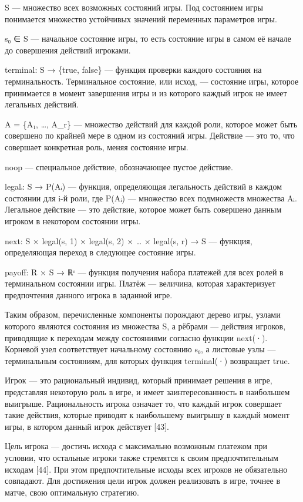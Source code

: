 S — множество всех возможных состояний игры. Под состоянием игры понимается множество устойчивых значений переменных параметров игры.

s₀ ∈ S — начальное состояние игры, то есть состояние игры в самом её начале до совершения действий игроками.

terminal: S → \{true, false\} — функция проверки каждого состояния на терминальность. Терминальное состояние, или исход, — состояние игры, которое принимается в момент завершения игры и из которого каждый игрок не имеет легальных действий.

A = \{A₁, …, A\_r\} — множество действий для каждой роли, которое может быть совершено по крайней мере в одном из состояний игры. Действие — это то, что совершает конкретная роль, меняя состояние игры.

noop — специальное действие, обозначающее пустое действие.

legalᵢ: S → P(Aᵢ) — функция, определяющая легальность действий в каждом состоянии для i-й роли, где P(Aᵢ) — множество всех подмножеств множества Aᵢ. Легальное действие — это действие, которое может быть совершено данным игроком в некотором состоянии игры.

next: S × legal(s, 1) × legal(s, 2) × … × legal(s, r) → S — функция, определяющая переход в следующее состояние игры.

payoff: R × S → ℝʳ — функция получения набора платежей для всех ролей в терминальном состоянии игры. Платёж — величина, которая характеризует предпочтения данного игрока в заданной игре.

Таким образом, перечисленные компоненты порождают дерево игры, узлами которого являются состояния из множества S, а рёбрами — действия игроков, приводящие к переходам между состояниями согласно функции next(·). Корневой узел соответствует начальному состоянию s₀, а листовые узлы — терминальным состояниям, для которых функция terminal(·) возвращает true.

Игрок — это рациональный индивид, который принимает решения в игре, представляя некоторую роль в игре, и имеет заинтересованность в наибольшем выигрыше. Рациональность игрока означает то, что каждый игрок совершает такие действия, которые приводят к наибольшему выигрышу в каждый момент игры, в котором данный игрок действует [43].

Цель игрока — достичь исхода с максимально возможным платежом при условии, что остальные игроки также стремятся к своим предпочтительным исходам [44]. При этом предпочтительные исходы всех игроков не обязательно совпадают. Для достижения цели игрок должен реализовать в игре, точнее в матче, свою оптимальную стратегию.

